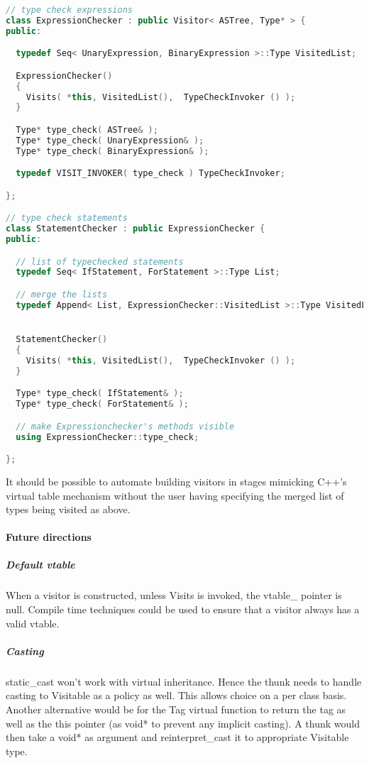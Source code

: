 \documentclass{book}
\begin{document}
\begin{lstlisting}[caption={visitor pattern sample code 5, commandexample.cpp},language=C++]
// type check expressions
class ExpressionChecker : public Visitor< ASTree, Type* > {
public:

  typedef Seq< UnaryExpression, BinaryExpression >::Type VisitedList;

  ExpressionChecker()
  {
    Visits( *this, VisitedList(),  TypeCheckInvoker () );
  }

  Type* type_check( ASTree& );
  Type* type_check( UnaryExpression& );
  Type* type_check( BinaryExpression& );

  typedef VISIT_INVOKER( type_check ) TypeCheckInvoker;

};

// type check statements
class StatementChecker : public ExpressionChecker {
public:

  // list of typechecked statements
  typedef Seq< IfStatement, ForStatement >::Type List;

  // merge the lists
  typedef Append< List, ExpressionChecker::VisitedList >::Type VisitedList;


  StatementChecker()
  {
    Visits( *this, VisitedList(),  TypeCheckInvoker () );
  }

  Type* type_check( IfStatement& );
  Type* type_check( ForStatement& );

  // make Expressionchecker's methods visible
  using ExpressionChecker::type_check;

};
\end{lstlisting}
It should be possible to automate building visitors in stages mimicking C++'s virtual table mechanism without the user having specifying the merged list of types being visited as above.
\paragraph{Future directions}
\subparagraph{Default vtable}

When a visitor is constructed, unless Visits is invoked, the vtable\_ pointer is null. Compile time techniques could be used to ensure that a visitor always has a valid vtable.
\subparagraph{Casting}

static\_cast won't work with virtual inheritance. Hence the thunk needs to handle casting to Visitable as a policy as well.
This allows choice on a per class basis.
Another alternative would be for the Tag virtual function to return the tag as well as the this pointer (as void* to prevent any implicit casting).
A thunk would then take a void* as argument and reinterpret\_cast it to appropriate Visitable type.
\end{document}
